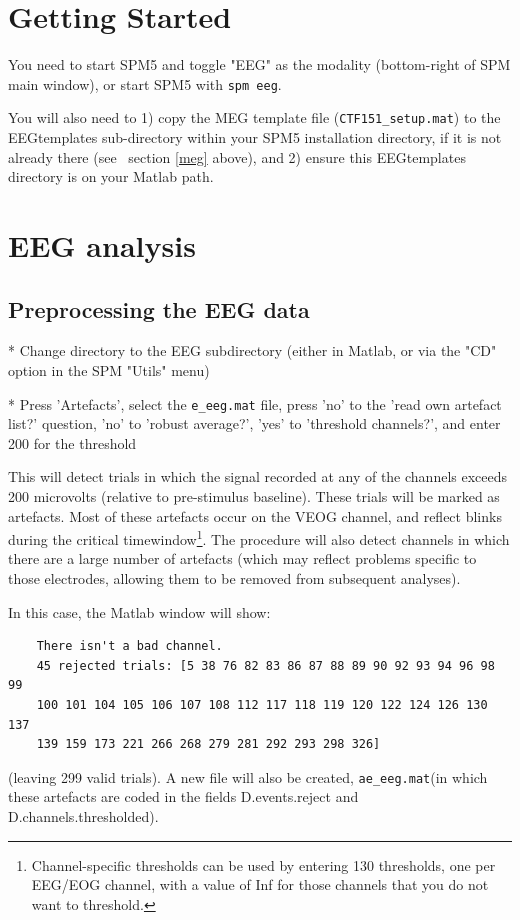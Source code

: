 \section{Getting Started}

You need to start SPM5 and toggle "EEG" as the modality (bottom-right of SPM main window), or start SPM5 with \verb!spm eeg!.

You will also need to 1) copy the MEG template file (\verb!CTF151_setup.mat!) to the EEGtemplates sub-directory within your SPM5 installation directory, if it is not already there (see ~section \ref{meg} above), and 2) ensure this EEGtemplates directory is on your Matlab path.


\section{EEG analysis}

\subsection{Preprocessing the EEG data}

* Change directory to the EEG subdirectory (either in Matlab, or via the "CD" option in the SPM "Utils" menu)

* Press 'Artefacts', select the \verb!e_eeg.mat! file, press 'no' to the 'read own artefact list?' question, 'no' to 'robust average?', 'yes' to 'threshold channels?', and enter 200 for the threshold

This will detect trials in which the signal recorded at any of the channels exceeds 200 microvolts (relative to pre-stimulus baseline). These trials will be marked as artefacts. Most of these artefacts occur on the VEOG channel, and reflect blinks during the critical timewindow\footnote{Channel-specific thresholds can be used by entering 130 thresholds, one per EEG/EOG channel, with a value of Inf for those channels that you do not want to threshold.}. The procedure will also detect channels in which there are a large number of artefacts (which may reflect problems specific to those electrodes, allowing them to be removed from subsequent analyses).

In this case, the Matlab window will show:
\begin{verbatim}
	There isn't a bad channel.
	45 rejected trials: [5 38 76 82 83 86 87 88 89 90 92 93 94 96 98 99
    100 101 104 105 106 107 108 112 117 118 119 120 122 124 126 130 137
    139 159 173 221 266 268 279 281 292 293 298 326]
\end{verbatim}
(leaving 299 valid trials). A new file will also be created, \verb!ae_eeg.mat!(in which these artefacts are coded in the fields D.events.reject and D.channels.thresholded).

